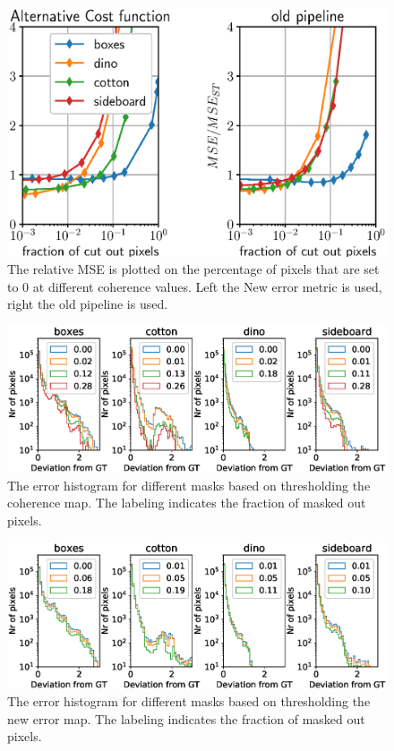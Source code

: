 \documentclass  [
  paper    = a4,
  BCOR     = 10mm,
  twoside,
  fontsize = 12pt,
  fleqn,
  toc      = bibnumbered,
  toc      = listofnumbered,
  numbers  = noendperiod,
  headings = normal,
  listof   = leveldown,
  version  = 3.03
]                                       {scrreprt}
\begin{document}
\begin{figure}
	\centering
	\includegraphics[width=1\linewidth]{images/newerror_confidence}
	\caption[Dependence of error on cut out pixels]{The relative MSE is plotted on the percentage of pixels that are set to 0 at different coherence values. Left the New error metric is used, right the old pipeline is used.}
	\label{fig:newerrorconfidence}
\end{figure}



\begin{figure}
	\centering
	\includegraphics[width=1\linewidth]{images/histogram_error_mask_old}
	\caption[Histogram when masking errors]{The error histogram for different masks based on thresholding the coherence map. The labeling indicates the fraction of masked out pixels.}
	\label{fig:histogramerrormaskold}
\end{figure}

\begin{figure}
	\centering
	\includegraphics[width=1\linewidth]{images/histogram_error_mask_new_err}
	\caption[Histogram when masking errors with new error map]{The error histogram for different masks based on thresholding the new error map. The labeling indicates the fraction of masked out pixels.}
	\label{fig:histogramerrormasknewerr}
\end{figure}
\end{document}
